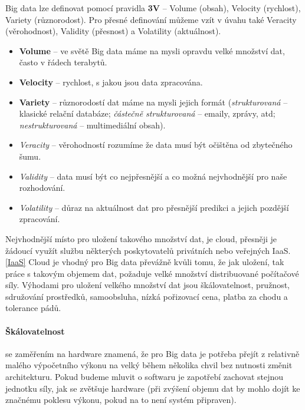 \par Big data lze definovat pomocí pravidla \textbf{3V} -- Volume (obsah), Velocity (rychlost), Variety (různorodost). Pro přesné definování můžeme vzít v úvahu také Veracity (věrohodnost), Validity (přesnost) a Volatility (aktuálnost).\cite{big-data-action}
\begin{itemize}
\item \textbf{Volume} -- ve světě Big data máme na mysli opravdu velké množství dat, často v řádech terabytů.
\item \textbf{Velocity} -- rychlost, s jakou jsou data zpracována.
\item \textbf{Variety} -- různorodostí dat máme na mysli jejich formát (\textit{strukturovaná} -- klasické relační databáze; \textit{částečně strukturovaná} -- emaily, zprávy, atd; \textit{nestrukturovaná} -- multimediální obsah).
\item \textit{Veracity} -- věrohodností rozumíme že data musí být očištěna od zbytečného šumu.
\item \textit{Validity} -- data musí být co nejpřesnější a co možná nejvhodnější pro naše rozhodování.
\item \textit{Volatility} -- důraz na aktuálnost dat pro přesnější predikci a jejich pozdější zpracování. \cite{big-data-action}
\end{itemize}

Nejvhodnější místo pro uložení takového množství dat, je cloud, přesněji je žádoucí využít službu některých poskytovatelů privátních nebo veřejných IaaS. \ref{IaaS} Cloud je vhodný pro Big data převážně kvůli tomu, že jak uložení, tak práce s takovým objemem dat, požaduje velké množství distribuované počítačové síly. Výhodami pro uložení velkého množství dat jsou škálovatelnost, pružnost, sdružování prostředků, samoobsluha, nízká pořizovací cena, platba za chodu a tolerance pádů. \cite{big-data-dummies}

\paragraph{Škálovatelnost} se zaměřením na hardware znamená, že pro Big data je potřeba přejít z relativně malého výpočetního výkonu na velký během několika chvil bez nutnosti změnit architekturu. Pokud budeme mluvit o softwaru je zapotřebí zachovat stejnou jednotku síly, jak se zvětšuje hardware (při zvýšení objemu dat by mohlo dojít ke značnému poklesu výkonu, pokud na to není systém připraven). \cite{big-data-dummies}

